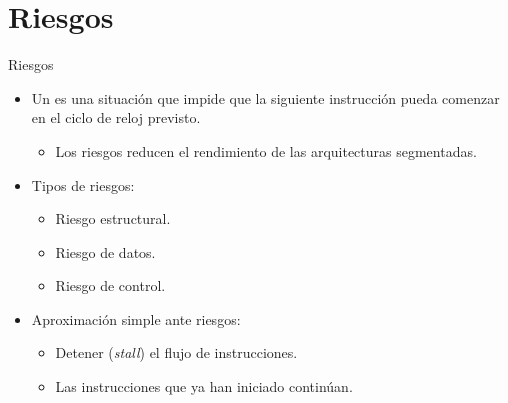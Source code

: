 \section{Riesgos}

\begin{frame}[t]{Riesgos}
\begin{itemize}
  \item Un  es una situación que impide que la siguiente
        instrucción pueda comenzar en el ciclo de reloj previsto.
    \begin{itemize}
      \item Los riesgos reducen el rendimiento de las arquitecturas
            segmentadas.
    \end{itemize}

  \item Tipos de riesgos:
    \begin{itemize}
      \item Riesgo estructural.
      \item Riesgo de datos.
      \item Riesgo de control.
    \end{itemize}

  \item Aproximación simple ante riesgos:
    \begin{itemize}
      \item Detener (\emph{stall}) el flujo de instrucciones.
      \item Las instrucciones que ya han iniciado continúan.
    \end{itemize}
\end{itemize}
\end{frame}

